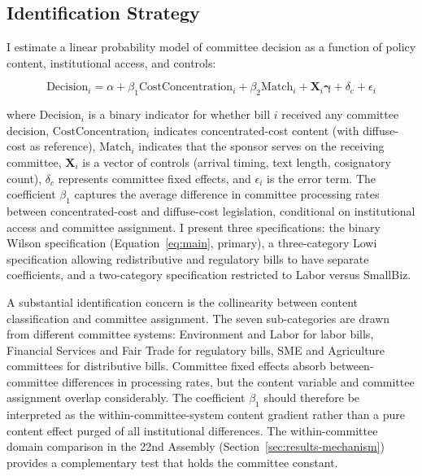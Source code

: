 \documentclass[11pt]{article}
\begin{document}
\subsection{Identification Strategy}
\label{sec:ident}

I estimate a linear probability model of committee decision as a function of policy content, institutional access, and controls:

\begin{equation}
\text{Decision}_i = \alpha + \beta_1 \text{CostConcentration}_i + \beta_2 \text{Match}_i + \mathbf{X}_i \boldsymbol{\gamma} + \delta_c + \epsilon_i
\label{eq:main}
\end{equation}

\noindent where $\text{Decision}_i$ is a binary indicator for whether bill $i$ received any committee decision, $\text{CostConcentration}_i$ indicates concentrated-cost content (with diffuse-cost as reference), $\text{Match}_i$ indicates that the sponsor serves on the receiving committee, $\mathbf{X}_i$ is a vector of controls (arrival timing, text length, cosignatory count), $\delta_c$ represents committee fixed effects, and $\epsilon_i$ is the error term. The coefficient $\beta_1$ captures the average difference in committee processing rates between concentrated-cost and diffuse-cost legislation, conditional on institutional access and committee assignment. I present three specifications: the binary Wilson specification (Equation~\ref{eq:main}, primary), a three-category Lowi specification allowing redistributive and regulatory bills to have separate coefficients, and a two-category specification restricted to Labor versus SmallBiz.

A substantial identification concern is the collinearity between content classification and committee assignment. The seven sub-categories are drawn from different committee systems: Environment and Labor for labor bills, Financial Services and Fair Trade for regulatory bills, SME and Agriculture committees for distributive bills. Committee fixed effects absorb between-committee differences in processing rates, but the content variable and committee assignment overlap considerably. The coefficient $\beta_1$ should therefore be interpreted as the within-committee-system content gradient rather than a pure content effect purged of all institutional differences. The within-committee domain comparison in the 22nd Assembly (Section~\ref{sec:results-mechanism}) provides a complementary test that holds the committee constant.
\end{document}
